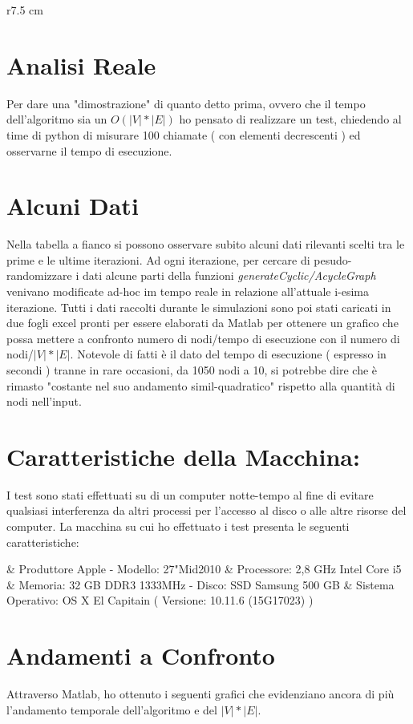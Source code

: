 \begin{wraptable}{r}{7.5 cm}
	\vspace{-10pt}
	\vspace{-10pt}
\end{wraptable} 
\section{Analisi Reale}
Per dare una "dimostrazione" di quanto detto prima, ovvero che il tempo dell'algoritmo sia un $O(|V|*|E|)$ ho pensato di realizzare un test, chiedendo al time di python di misurare 100 chiamate ( con elementi decrescenti ) ed osservarne il tempo di esecuzione.
\section{Alcuni Dati}
Nella tabella a fianco si possono osservare subito alcuni dati rilevanti scelti tra le prime e le ultime iterazioni. Ad ogni iterazione, per cercare di pesudo-randomizzare i dati alcune parti della funzioni \emph{generateCyclic/AcycleGraph} venivano modificate ad-hoc im tempo reale in relazione all'attuale i-esima iterazione. Tutti i dati raccolti durante le simulazioni  sono poi stati caricati in due fogli excel pronti per essere elaborati da Matlab per ottenere un grafico che possa mettere a confronto numero di nodi/tempo di esecuzione con il numero di nodi/$|V|*|E|$. Notevole di fatti è il dato del tempo di esecuzione ( espresso in secondi ) tranne in rare occasioni, da 1050 nodi a 10, si potrebbe dire che è rimasto "costante nel suo andamento simil-quadratico" rispetto alla quantità di nodi nell'input.
\section{Caratteristiche della Macchina:}I test sono stati effettuati su di un computer notte-tempo al fine di evitare qualsiasi interferenza da altri processi per l'accesso al disco o alle altre risorse del computer. La macchina su cui ho effettuato i test presenta le seguenti caratteristiche:
\begin{easylist}[itemize]
		& Produttore Apple -  Modello: 27"Mid2010
		& Processore: 2,8 GHz Intel Core i5
		& Memoria: 32 GB  DDR3  1333MHz - Disco: SSD Samsung 500 GB
		& Sistema Operativo: OS X El Capitain ( Versione: 10.11.6 (15G17023) )
\end{easylist}

\section{Andamenti a Confronto}
Attraverso Matlab, ho ottenuto i seguenti grafici che evidenziano ancora di più l'andamento temporale dell'algoritmo e del $|V|*|E|$.\\ \\



